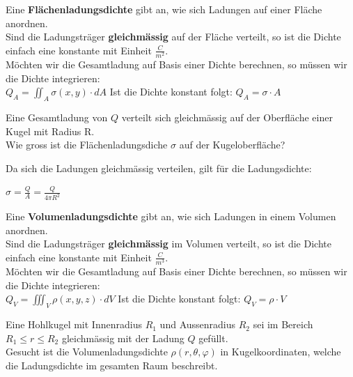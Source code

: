 \beginip
Eine \textbf{Flächenladungsdichte} gibt an, wie sich Ladungen auf einer Fläche anordnen. \\
Sind die Ladungsträger \textbf{gleichmässig} auf der Fläche verteilt, so ist die Dichte einfach eine konstante mit Einheit $\frac{C}{m^2}$. \\
Möchten wir die Gesamtladung auf Basis einer Dichte berechnen, so müssen wir die Dichte integrieren: \\
\formulaBegin
$\displaystyle Q_{A} = \iint_A \sigma (x,y) \cdot dA$
\formulaEnd
Ist die Dichte konstant folgt:
\formulaBegin
$\displaystyle Q_{A} = \sigma \cdot A$
\formulaEnd
\iend







\beginbsp
Eine Gesamtladung von $Q$ verteilt sich gleichmässig auf der Oberfläche einer Kugel mit Radius R. \\
Wie gross ist die Flächenladungsdiche $\sigma$ auf der Kugeloberfläche?
\iend


\beginbsp
Da sich die Ladungen gleichmässig verteilen, gilt für die Ladungsdichte:
\begin{center}
	$\displaystyle \sigma = \frac{Q}{A} = \frac{Q}{4\pi R^2}$
\end{center}
\iend






\newpage

\beginip
Eine \textbf{Volumenladungsdichte} gibt an, wie sich Ladungen in einem Volumen anordnen. \\
Sind die Ladungsträger \textbf{gleichmässig} im Volumen verteilt, so ist die Dichte einfach eine konstante mit Einheit $\frac{C}{m^3}$. \\
Möchten wir die Gesamtladung auf Basis einer Dichte berechnen, so müssen wir die Dichte integrieren: \\
\formulaBegin
$\displaystyle Q_{V} = \iiint_V \rho (x,y,z) \cdot dV$
\formulaEnd
Ist die Dichte konstant folgt:
\formulaBegin
$\displaystyle Q_{V} = \rho \cdot V$
\formulaEnd
\iend




\beginbsp
Eine Hohlkugel mit Innenradius $R_1$ und Aussenradius $R_2$ sei im Bereich $ R_1 \leq r \leq R_2$ gleichmässig mit der Ladung $Q$ gefüllt. \\
Gesucht ist die Volumenladungsdichte $\rho(r,\theta,\varphi)$ in Kugelkoordinaten, welche die Ladungsdichte im gesamten Raum beschreibt.
\iend


